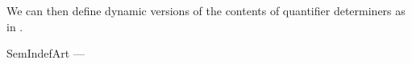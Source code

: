 We can then define dynamic versions of the contents of quantifier
determiners as in \nexteg{}.  %
\begin{ex} 
\begin{subex} 
 

 










  
\item SemIndefArt ---


\end{subex}
\end{ex}

